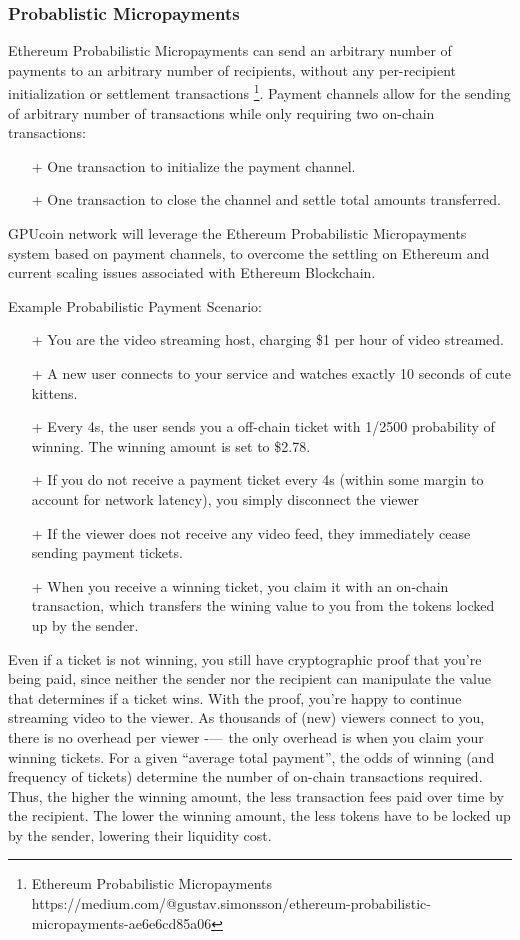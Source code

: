 \documentclass{article}
\begin{document}

\subsubsection{Probablistic Micropayments}
Ethereum Probabilistic Micropayments can send an arbitrary number of payments to an arbitrary number of recipients, without any per-recipient initialization or settlement transactions \footnote{Ethereum Probabilistic Micropayments
 https://medium.com/@gustav.simonsson/ethereum-probabilistic-micropayments-ae6e6cd85a06}. Payment channels allow for the sending of arbitrary number of transactions  while only requiring two on-chain transactions:

\begin{itemize}
 \item[+]One transaction to initialize the payment channel.
 \item[+]One transaction to close the channel and settle total amounts transferred.
\end{itemize}

GPUcoin network will leverage the Ethereum Probabilistic Micropayments system based on payment channels, to overcome the settling on Ethereum and current scaling issues associated with Ethereum Blockchain.

Example Probabilistic Payment Scenario:
\begin{itemize}
\item[+]You are the video streaming host, charging \$1 per hour of video streamed.
\item[+]A new user connects to your service and watches exactly 10 seconds of cute kittens.
\item[+]Every 4s, the user sends you a off-chain ticket with 1/2500 probability of winning. The winning amount is set to \$2.78.
\item[+]If you do not receive a payment ticket every 4s (within some margin to account for network latency), you simply disconnect the viewer
\item[+]If the viewer does not receive any video feed, they immediately cease sending payment tickets.
\item[+]When you receive a winning ticket, you claim it with an on-chain transaction, which transfers the wining value to you from the tokens locked up by the sender.
\end{itemize}
Even if a ticket is not winning, you still have cryptographic proof that you’re being paid, since neither the sender nor the recipient can manipulate the value that determines if a ticket wins. With the proof, you’re happy to continue streaming video to the viewer. As thousands of (new) viewers connect to you, there is no overhead per viewer -—  the only overhead is when you claim your winning tickets.
For a given “average total payment”, the odds of winning (and frequency of tickets) determine the number of on-chain transactions required. Thus, the higher the winning amount, the less transaction fees paid over time by the recipient. The lower the winning amount, the less tokens have to be locked up by the sender, lowering their liquidity cost.
\end{document}

